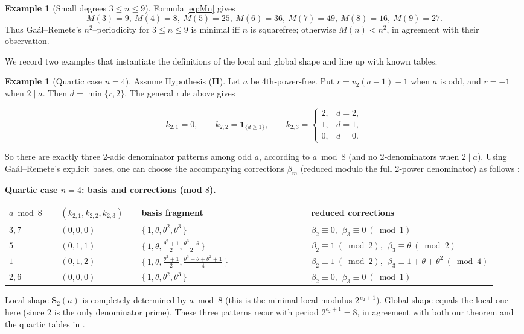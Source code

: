 \documentclass[12pt,a4paper,oneside]{amsart}
\theoremstyle{definition}
\newtheorem{example}[theorem]{Example}
\begin{document}
\begin{example}[Small degrees $3\le n\le 9$]
Formula \eqref{eq:Mn} gives
\[
M(3)=9,\ M(4)=8,\ M(5)=25,\ M(6)=36,\ M(7)=49,\ M(8)=16,\ M(9)=27.
\]
Thus Ga\'al--Remete’s $n^2$–periodicity for $3\le n\le 9$ is minimal iff $n$ is squarefree; otherwise
$M(n)<n^2$, in agreement with their observation.   
\end{example}

We record two examples that instantiate the definitions of the local and global shape and line up with known tables.

\begin{example}[Quartic case $n=4$]\label{ex:quartic-shape}
Assume Hypothesis (\textbf{H}). Let $a$ be 4th‑power‑free. Put $r=v_2(a-1)-1$ when $a$ is odd, and $r=-1$ when $2\mid a$. Then $d=\min\{r,2\}$. The general rule above gives

$$
k_{2,1}=0,\qquad
k_{2,2}=\mathbf 1_{\{d\ge1\}},\qquad
k_{2,3}=
\begin{cases}
2,& d=2,\\
1,& d=1,\\
0,& d=0.
\end{cases}
$$

So there are exactly three 2‑adic denominator patterns among odd $a$, according to $a\bmod 8$ (and no 2‑denominators when $2\mid a$). Using Ga\'al--Remete’s explicit bases, one can choose the accompanying corrections $\beta_m$ (reduced modulo the full 2‑power denominator) as follows :

\noindent\textbf{Quartic case \(n=4\): basis and corrections (mod \(8\)).}
\begin{center}
\small
\setlength{\tabcolsep}{4pt}
\renewcommand{\arraystretch}{1.15}
\begin{tabular}{@{}p{0.11\linewidth} p{0.17\linewidth} p{0.38\linewidth} p{0.28\linewidth}@{}}
\hline
\textbf{$a\bmod 8$} &
\textbf{$(k_{2,1},k_{2,2},k_{2,3})$} &
\textbf{basis fragment} &
\textbf{reduced corrections}\\
\hline
$3,7$ & $(0,0,0)$ &
$\{\,1,\theta,\theta^2,\theta^3\,\}$ &
$\beta_2\equiv 0,\ \ \beta_3\equiv 0\ (\bmod 1)$\\[2pt]
$5$ & $(0,1,1)$ &
$\bigl\{\,1,\theta,\frac{\theta^2+1}{2},\frac{\theta^3+\theta}{2}\,\bigr\}$ &
$\beta_2\equiv 1\ (\bmod 2),\ \ \beta_3\equiv \theta\ (\bmod 2)$\\[2pt]
$1$ & $(0,1,2)$ &
$\bigl\{\,1,\theta,\frac{\theta^2+1}{2},\frac{\theta^3+\theta+\theta^2+1}{4}\,\bigr\}$ &
$\beta_2\equiv 1\ (\bmod 2),\ \ \beta_3\equiv 1+\theta+\theta^2\ (\bmod 4)$\\[2pt]
\hline
$2,6$ & $(0,0,0)$ &
$\{\,1,\theta,\theta^2,\theta^3\,\}$ &
$\beta_2\equiv 0,\ \ \beta_3\equiv 0\ (\bmod 1)$\\
\hline
\end{tabular}
\end{center}

Local shape $\mathbf S_2(a)$ is completely determined by $a\bmod 8$ (this is the minimal local modulus $2^{\,e_2+1}$). Global shape equals the local one here (since $2$ is the only denominator prime). These three patterns recur with period $2^{e_2+1}=8$, in agreement with both our theorem and the quartic tables in \cite{GR17}. 
\end{example}
\end{document}
